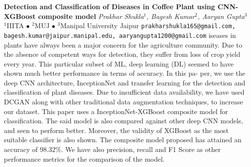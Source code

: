 
    \begin{conf-abstract}[]
        {\textbf{Detection and Classification of Diseases in Coffee Plant using CNN-XGBoost composite model}}
        {\textit{Prakhar Shukla$^{1}$, Bagesh Kumar$^{2}$, Aaryan  Gupta$^{3}$}}
        {$^{1}$IIITA $\bullet$ $^{2}$MUJ $\bullet$ $^{3}$Manipal University Jaipur}
        {\texttt{prakharshukla165@gmail.com, bagesh.kumar@jaipur.manipal.edu, aaryangupta1200@gmail.com}}
        {iseases in plants have always been a major concern for the agriculture community. Due to the absence of competent ways for detection, they suffer from loss of crop yield every year. This particular subset of ML, deep learning (DL) seemed to have shown much better performance in terms of accuracy. In this pa- per, we use the deep CNN architecture, InceptionNet and transfer learning for the detection and classification of plant diseases. Due to insufficient data availability, we have used DCGAN along with other traditional data augmentation techniques, to increase our dataset. This paper uses a InceptionNet-XGBoost composite model for classification. The said model is also compared against other deep CNN models, and seen to perform better. Moreover, the validity of XGBoost as the most suitable classifier is also shown. The composite model proposed has attained an accuracy of 98.32\%. We have also precision, recall and F1 Score as other performance metrics for the comparison of the model.}
    \end{conf-abstract}
        